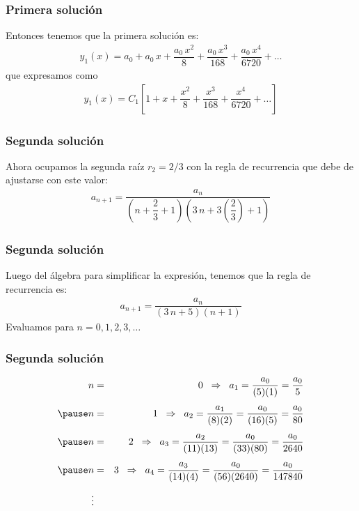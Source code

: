 \begin{frame}
\frametitle{Primera solución}
Entonces tenemos que la primera solución es:
\begin{align*}
y_{1} (x) = a_{0} + a_{0} \, x + \dfrac{a_{0} \, x^{2}}{8} + \dfrac{a_{0} \, x^{3}}{168} + \dfrac{a_{0} \, x^{4}}{6720} + \ldots 
\end{align*}
\pause
que expresamos como
\begin{align*}
y_{1}(x) = C_{1} \left[ 1 + x + \dfrac{x^{2}}{8} + \dfrac{x^{3}}{168} + \dfrac{x^{4}}{6720} + \ldots \right]
\end{align*}
\end{frame}
\begin{frame}
\frametitle{Segunda solución}
Ahora ocupamos la segunda raíz $r_{2} = 2/3$ con la regla de recurrencia que debe de ajustarse con este valor:
\begin{align*}
a_{n+1} = \dfrac{a_{n}}{\left( n + \dfrac{2}{3} + 1  \right)\left( 3 \, n + 3 \left( \dfrac{2}{3} \right) + 1 \right)}
\end{align*}
\end{frame}
\begin{frame}
\frametitle{Segunda solución}
Luego del álgebra para simplificar la expresión, tenemos que la regla de recurrencia es:
\begin{align*}
a_{n+1} = \dfrac{a_{n}}{(3 \, n + 5)(n + 1)}
\end{align*}
Evaluamos para $n = 0, 1, 2, 3, \ldots$
\end{frame}
\begin{frame}
\frametitle{Segunda solución}
\begin{eqnarray*}
n &=& 0 \hspace{0.2cm} \Rightarrow \hspace{0.2cm} a_{1} = \dfrac{a_{0}}{(5)(1)} = \dfrac{a_{0}}{5} \\[0.45em] \pause
n &=& 1 \hspace{0.2cm} \Rightarrow \hspace{0.2cm} a_{2} = \dfrac{a_{1}}{(8)(2)} = \dfrac{a_{0}}{(16)(5)} = \dfrac{a_{0}}{80} \\[0.45em] \pause
n &=& 2 \hspace{0.2cm} \Rightarrow \hspace{0.2cm} a_{3} = \dfrac{a_{2}}{(11)(13)} = \dfrac{a_{0}}{(33)(80)} = \dfrac{a_{0}}{2640} \\[0.45em] \pause
n &=& 3 \hspace{0.2cm} \Rightarrow \hspace{0.2cm} a_{4} = \dfrac{a_{3}}{(14)(4)} = \dfrac{a_{0}}{(56)(2640)} = \dfrac{a_{0}}{147840} \\[0.45em]
\vdots
\end{eqnarray*}
\end{frame}
